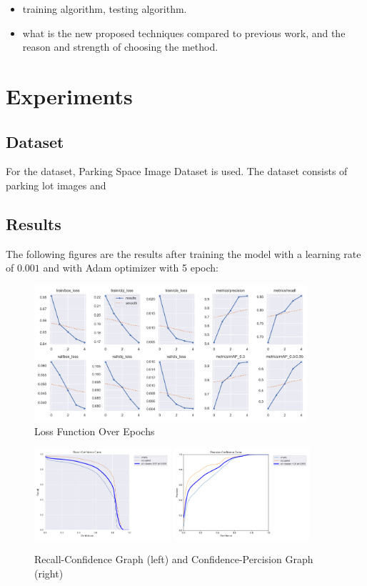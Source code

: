 \documentclass{article}
\begin{document}
\begin{itemize}
    \item training algorithm, testing algorithm.
    \item what is the new proposed techniques compared to previous work, and the reason and strength of choosing the method.
\end{itemize}

\section{Experiments}

\subsection{Dataset}
For the dataset, Parking Space Image Dataset is used. The dataset consists of parking lot images and  

\subsection{Results}

The following figures are the results after training the model with a learning rate of $0.001$ and with Adam optimizer with 5 epoch: 
\begin{figure}[ht]
    \centering
    \includegraphics[width=0.9\textwidth]{figs/loss-function.png}
    \caption{Loss Function Over Epochs}
\end{figure}
\begin{figure}[ht]
    \centering
    \includegraphics[width=0.45\textwidth]{figs/recall-confidence.png}
    \includegraphics[width=0.45\textwidth]{figs/percision-confidence.png}
    \caption{Recall-Confidence Graph (left) and Confidence-Percision Graph (right) }
\end{figure}
\end{document}
